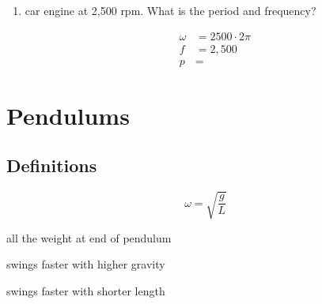 \documentclass{exam}
\begin{document}
\begin{enumerate}

    \item car engine at 2,500 rpm.  What is the period and frequency?
      \begin{solution}
        \begin{align*}
          \omega &= 2500 \cdot 2 \pi \\
          f &= 2,500 \\
          p &= 
        \end{align*}
      \end{solution}
  \end{enumerate}

  \section{Pendulums}

  \subsection{Definitions}
  \[
    \omega = \sqrt{\frac{g}{L}}
  \]

  \begin{itemize*}
    \item all the weight at end of pendulum
    \item swings faster with higher gravity
    \item swings faster with shorter length
  \end{itemize*}
\end{document}

